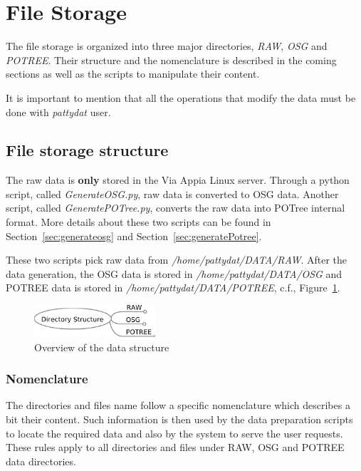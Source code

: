\section{File Storage}
\label{sec:data_structure}
The file storage is organized into three major directories, {\em RAW}, {\em OSG}
and {\em POTREE}. Their structure and the nomenclature is described in the coming
sections as well as the scripts to manipulate their content.

It is important to mention that all the operations that modify the data must be done with \textit{pattydat} user.

\subsection{File storage structure}
\label{sec:descriptiondata}
The raw data is \textbf{only} stored in the Via Appia Linux server. Through a python
script, called \textit{GenerateOSG.py}, raw data is converted to OSG data. Another
script, called \textit{GeneratePOTree.py}, converts the raw data into POTree
internal format. More details about these two scripts can be found in Section~\ref{sec:generateosg}
and Section~\ref{sec:generatePotree}. 

These two scripts pick raw data from \textit{/home/pattydat/DATA/RAW}. After the data
generation, the OSG data is stored in \textit{/home/pattydat/DATA/OSG} and POTREE data
is stored in \textit{/home/pattydat/DATA/POTREE}, c.f., Figure~\ref{fig:directory_structure_overview}.

\begin{figure}[!ht] \centering
\includegraphics[width=0.4\textwidth]{fig/data_structure/directory_structure_overview}
\caption{Overview of the data structure}
\label{fig:directory_structure_overview} \end{figure}

\subsubsection{Nomenclature}
The directories and files name follow a specific nomenclature which describes a
bit their content. Such information is then used by the data preparation scripts
to locate the required data and also by the system to serve the user requests.
These rules apply to all directories and files under RAW, OSG and POTREE data
directories.

